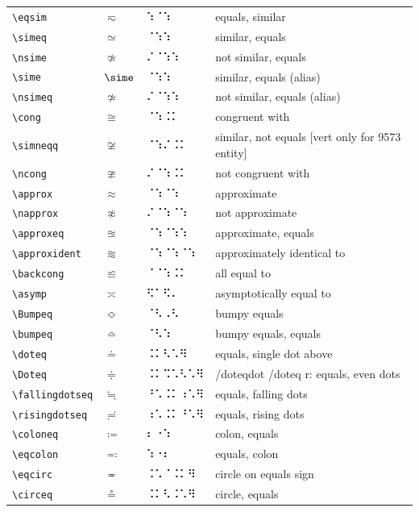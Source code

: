 \documentclass[oneside]{article}
\begin{document}
\begin{longtable}{llll}
\verb|\eqsim| & $\eqsim$ &   ⠱⠈⠱   & {equals, similar} \\[2ex]
\verb|\simeq| & $\simeq$ &   ⠈⠱⠱   & {similar, equals} \\[2ex]
\verb|\nsime| & $\nsime$ &   ⠌⠈⠱⠱   & {not similar, equals} \\[2ex]
\verb|\sime| & $\sime$ &   ⠈⠱⠱   & {similar, equals (alias)} \\[2ex]
\verb|\nsimeq| & $\nsimeq$ &   ⠌⠈⠱⠱   & {not similar, equals (alias)} \\[2ex]
\verb|\cong| & $\cong$ &   ⠈⠱⠨⠅   & {congruent with} \\[2ex]
\verb|\simneqq| & $\simneqq$ &   ⠈⠱⠌⠨⠅   & {similar, not equals [vert only for 9573 entity]} \\[2ex]
\verb|\ncong| & $\ncong$ &   ⠌⠈⠱⠨⠅   & {not congruent with} \\[2ex]
\verb|\approx| & $\approx$ &   ⠈⠱⠈⠱   & {approximate} \\[2ex]
\verb|\napprox| & $\napprox$ &   ⠌⠈⠱⠈⠱   & {not approximate} \\[2ex]
\verb|\approxeq| & $\approxeq$ &   ⠈⠱⠈⠱⠱   & {approximate, equals} \\[2ex]
\verb|\approxident| & $\approxident$ &   ⠈⠱⠈⠱⠈⠱   & {approximately identical to} \\[2ex]
\verb|\backcong| & $\backcong$ &   ⠈⠈⠱⠨⠅   & {all equal to} \\[2ex]
\verb|\asymp| & $\asymp$ &   ⠫⠁⠫⠄   & {asymptotically equal to} \\[2ex]
\verb|\Bumpeq| & $\Bumpeq$ &   ⠈⠣⠠⠣   & {bumpy equals} \\[2ex]
\verb|\bumpeq| & $\bumpeq$ &   ⠈⠣⠱   & {bumpy equals, equals} \\[2ex]
\verb|\doteq| & $\doteq$ &   ⠨⠅⠣⠡⠻   & {equals, single dot above} \\[2ex]
\verb|\Doteq| & $\Doteq$ &   ⠨⠅⠩⠡⠣⠡⠻   & {/doteqdot /doteq r: equals, even dots} \\[2ex]
\verb|\fallingdotseq| & $\fallingdotseq$ &   ⠘⠡⠨⠅⠰⠡⠻   & {equals, falling dots} \\[2ex]
\verb|\risingdotseq| & $\risingdotseq$ &   ⠰⠡⠨⠅⠘⠡⠻   & {equals, rising dots} \\[2ex]
\verb|\coloneq| & $\coloneq$ &   ⠆⠐⠱   & {colon, equals} \\[2ex]
\verb|\eqcolon| & $\eqcolon$ &   ⠱⠐⠆   & {equals, colon} \\[2ex]
\verb|\eqcirc| & $\eqcirc$ &   ⠨⠡⠈⠨⠅⠻   & {circle on equals sign} \\[2ex]
\verb|\circeq| & $\circeq$ &   ⠨⠅⠣⠨⠡⠻   & {circle, equals} \\[2ex]

\end{longtable}
\end{document}
